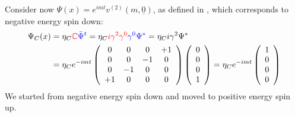 \documentclass[../main.tex]{subfiles}
\begin{document}
Consider now $\Psi(x)=e^{imt}v^{(2)}(m,\underline{0})$, as defined in , which corresponds to negative energy spin down:
\begin{align*}
\Psi_C(x)&=\eta_C{\color{red}\mathbb{C}}{\color{blue}\bar{\Psi}^t}=\eta_C{\color{red}i\gamma^2\gamma^0}{\color{blue}\gamma^0\Psi^*}=\eta_Ci\gamma^2\Psi^*\\
&=\eta_Ce^{-imt}\left(\begin{array}{cccc}
    0 & 0 & 0 & +1 \\
    0 & 0 & -1 & 0 \\
    0 & -1 & 0 & 0 \\
    +1 & 0 & 0 & 0 
\end{array}\right)
\left(\begin{array}{c}
    0 \\
    0 \\
    0 \\
    1
\end{array}\right)=\eta_Ce^{-imt}\left(\begin{array}{c}
    1 \\
    0 \\
    0 \\
    0
\end{array}\right)
\end{align*}
We started from negative energy spin down and moved to positive energy spin up.
\end{document}
